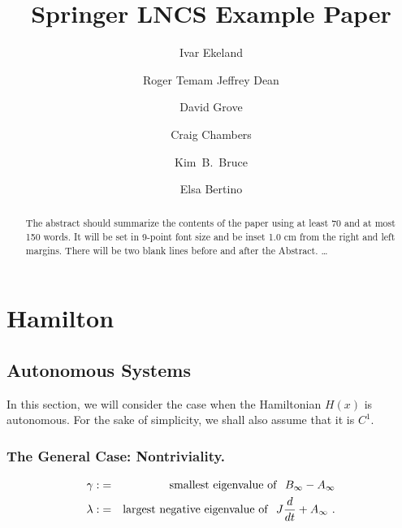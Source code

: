 \documentclass{llncs}
\begin{document}
\title{Springer LNCS Example Paper}
%

\author{Ivar Ekeland \and Roger Temam Jeffrey Dean \and David Grove \and Craig Chambers \and Kim~B.~Bruce \and Elsa Bertino} %
%



\maketitle              %

\begin{abstract}
The abstract should summarize the contents of the paper using at least 70 and at most 150 words. It will be set in 9-point font size and be inset 1.0 cm from the right and left margins.
There will be two blank lines before and after the Abstract. \dots {} \end{abstract}  

\section{Hamilton}
%
\subsection{Autonomous Systems}
%
In this section, we will consider the case when the Hamiltonian $H(x)$ is autonomous. For the sake of simplicity, we shall also assume that it is $C^{1}$.
%
\subsubsection{The General Case: Nontriviality.} %
\begin{eqnarray}
\gamma :&=&{\rm smallest\ eigenvalue\ of}\ \ B_{\infty} - A_{\infty} \\
   \lambda : &=& {\rm largest\ negative\ eigenvalue\ of}\ \
   J \frac{d}{dt} +A_{\infty}\ .
\end{eqnarray}
\end{document}
